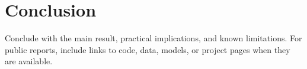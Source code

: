 \section{Conclusion}

Conclude with the main result, practical implications, and known limitations.
For public reports, include links to code, data, models, or project pages when
they are available.
